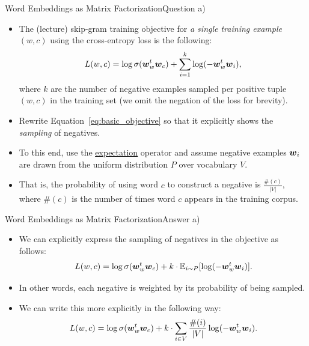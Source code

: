 \documentclass[t]{beamer}
\begin{document}
\begin{frame}{Word Embeddings as Matrix Factorization}{Question a)}
    \begin{itemize}
        \item The (lecture) skip-gram training objective for
              \emph{a single training example} $(w,c)$ using the cross-entropy
              loss is the following:
              \begin{align}\label{eq:basic_objective}
                  L(w,c) = \log \sigma({\boldsymbol{w}}_w^t{\boldsymbol{w}}_c) + \sum_{i=1}^k \log(-{\boldsymbol{w}}_w^t{\boldsymbol{w}}_i),
              \end{align}
              where $k$ are the number of negative examples sampled per positive
              tuple $(w,c)$ in the training set (we omit the negation of the
              loss for brevity).
        \item Rewrite Equation~\ref{eq:basic_objective} so that it explicitly
              shows the \emph{sampling} of negatives.
        \item To this end, use the
              \href{https://en.wikipedia.org/wiki/Expected_value}{\underline{expectation}}
              operator and assume negative examples ${\boldsymbol{w}}_i$ are drawn from the
              uniform distribution $P$ over vocabulary $V$.
        \item That is, the probability of using word $c$ to construct a negative
              is $\frac{\#(c)}{|V|}$, where $\#(c)$ is the number of times word
              $c$ appears in the training corpus.
    \end{itemize}
\end{frame}

\begin{frame}{Word Embeddings as Matrix Factorization}{Answer a)}
    \begin{itemize}
        \item We can explicitly express the sampling of negatives in the objective
              as follows:
              \begin{align}\label{eq:basic_objective_with_expectation}
                  L(w,c) = \log \sigma({\boldsymbol{w}}_w^t{\boldsymbol{w}}_c) + k\cdot \mathbb{E}_{i\sim P}[\log(-{\boldsymbol{w}}_w^t{\boldsymbol{w}}_i)].
              \end{align}
        \item In other words, each negative is weighted by its probability of
              being sampled.
        \item We can write this more explicitly in the following way:
              \begin{align}\label{eq:basic_objective_with_relative_freq}
                  L(w,c) = \log \sigma({\boldsymbol{w}}_w^t{\boldsymbol{w}}_c) + k\cdot \sum_{i\in V} \frac{\#(i)}{|V|}\log(-{\boldsymbol{w}}_w^t{\boldsymbol{w}}_i).
              \end{align}
    \end{itemize}
\end{frame}
\end{document}
